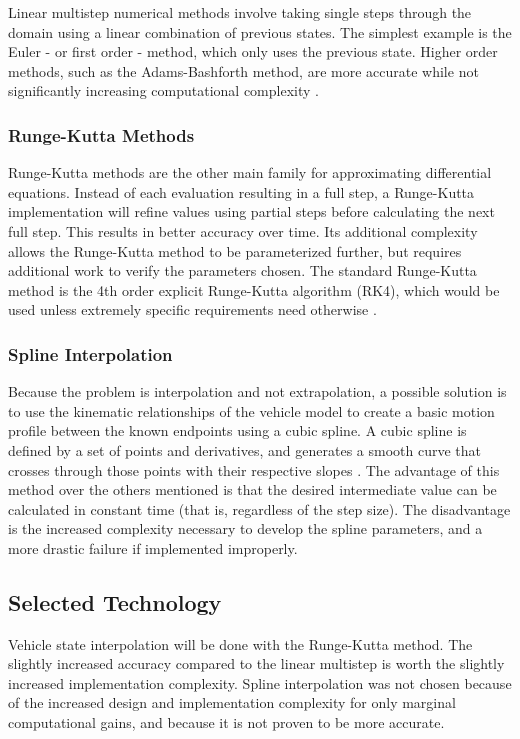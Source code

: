 \documentclass[10pt,draftclsnofoot,onecolumn]{article}
\begin{document}
Linear multistep numerical methods involve taking single steps through the domain using a linear combination of previous states. The simplest example is the Euler - or first order - method, which only uses the previous state. Higher order methods, such as the Adams-Bashforth method, are more accurate while not significantly increasing computational complexity \cite{shankar-LMM}. 

\subsubsection{Runge-Kutta Methods}

Runge-Kutta methods are the other main family for approximating differential equations. Instead of each evaluation resulting in a full step, a Runge-Kutta implementation will refine values using partial steps before calculating the next full step. This results in better accuracy over time. Its additional complexity allows the Runge-Kutta method to be parameterized further, but requires additional work to verify the parameters chosen. The standard Runge-Kutta method is the 4th order explicit Runge-Kutta algorithm (RK4), which would be used unless extremely specific requirements need otherwise \cite{cheever-rk4}.

\subsubsection{Spline Interpolation}

Because the problem is interpolation and not extrapolation, a possible solution is to use the kinematic relationships of the vehicle model to create a basic motion profile between the known endpoints using a cubic spline. A cubic spline is defined by a set of points and derivatives, and generates a smooth curve that crosses through those points with their respective slopes \cite{weisstein-spline}. The advantage of this method over the others mentioned is that the desired intermediate value can be calculated in constant time (that is, regardless of the step size). The disadvantage is the increased complexity necessary to develop the spline parameters, and a more drastic failure if implemented improperly.

\subsection{Selected Technology}

Vehicle state interpolation will be done with the Runge-Kutta method. The slightly increased accuracy compared to the linear multistep is worth the slightly increased implementation complexity. Spline interpolation was not chosen because of the increased design and implementation complexity for only marginal computational gains, and because it is not proven to be more accurate. 


\end{document}
